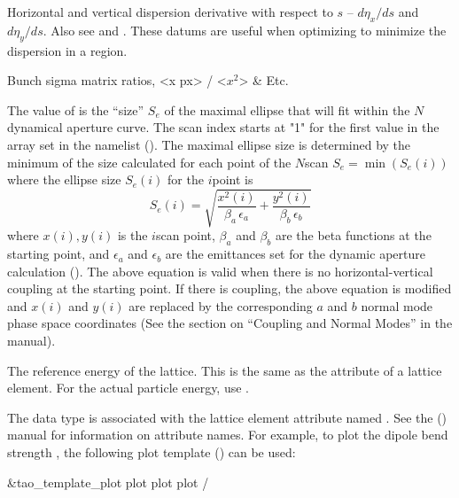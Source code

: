 \begin{description}
{{{{{  %
  \item[deta_ds.x, deta_ds.y] \Newline {}
Horizontal and vertical dispersion derivative with respect to $s$ -- $d\eta_x/ds$ and $d\eta_y/ds$.
Also see  and . These datums are useful when optimizing to minimize
the dispersion in a region.

  \item[dpx_dx, dpy_dy, etc.] \Newline {}
Bunch sigma matrix ratios, <x px> / <$x^2$> \& Etc.

  \item[dynamic_aperture.$N$, $N = 1, 2, 3 \ldots$] \Newline {}
The value of  is the ``size'' $S_e$ of the maximal ellipse that will fit
within the $N$\Th dynamical aperture curve. The scan index starts at "1" for the first value in the
 array set in the  namelist (). The maximal
ellipse size is determined by the minimum of the size calculated for each point of the $N$\Th scan
$S_e = \min(S_e(i))$ where the ellipse size $S_e(i)$ for the $i$\Th point is
\begin{equation}
  S_e(i) = \sqrt{ \frac{x^2(i)}{\beta_a \, \epsilon_a} + \frac{y^2(i)}{\beta_b \, \epsilon_b} }
\end{equation} 
where $x(i), y(i)$ is the $i$\Th scan point, $\beta_a$ and $\beta_b$ are the beta functions at the
starting point, and $\epsilon_a$ and $\epsilon_b$ are the emittances set for the dynamic aperture
calculation (). The above equation is valid when there is no horizontal-vertical
coupling at the starting point. If there is coupling, the above equation is modified and $x(i)$ and
$y(i)$ are replaced by the corresponding $a$ and $b$ normal mode phase space coordinates (See the section
on ``Coupling and Normal Modes'' in the \bmad manual).

  \item[e_tot_ref] \Newline {}
The reference energy of the lattice. This is the same as the  attribute of a lattice element.
For the actual particle energy, use .

  \item[element_attrib.<attrib_name>] \Newline {}
The  data type is associated with the
lattice element attribute named . See the \bmad
(\cite{b:bmad}) manual for information on attribute names. For
example, to plot the dipole bend strength , the following
plot template () can be used:
\begin{example}
  &tao_template_plot
    plot%
    plot%
    plot%
  /


\end{example}}}}}}
\end{description}
